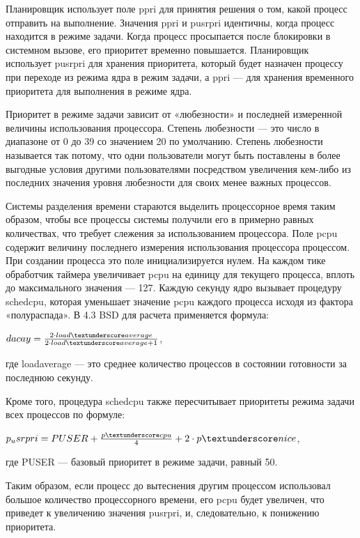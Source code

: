 \documentclass[12pt]{report}
\begin{document}
Планировщик использует поле p\textunderscore pri для принятия решения о том, какой процесс отправить на выполнение. Значения p\textunderscore pri и p\textunderscore usrpri идентичны, когда процесс находится в режиме задачи. Когда процесс просыпается после блокировки в системном вызове, его приоритет временно повышается. Планировщик использует p\textunderscore usrpri для хранения приоритета, который будет назначен процессу при переходе из режима ядра в режим задачи, а p\textunderscore pri — для хранения временного приоритета для выполнения в режиме ядра.

Приоритет в режиме задачи зависит от «любезности» и последней измеренной величины использования процессора. Степень любезности
—	это число в диапазоне от 0 до 39 со значением 20 по умолчанию. Степень любезности называется так потому, что одни пользователи могут быть поставлены в более выгодные условия другими пользователями посредством увеличения кем-либо из последних значения уровня любезности для своих менее важных процессов.

Системы разделения времени стараются выделить процессорное время таким образом, чтобы все процессы системы получили его в примерно равных количествах, что требует слежения за использованием процессора. Поле p\textunderscore cpu содержит величину последнего измерения использования процессора процессом. При создании процесса это поле инициализируется нулем. На каждом тике обработчик таймера увеличивает p\textunderscore cpu на единицу для текущего процесса, вплоть до максимального значения — 127. Каждую секунду ядро вызывает процедуру schedcpu, которая уменьшает значение p\textunderscore cpu каждого процесса исходя из фактора «полураспада». В 4.3 BSD для расчета применяется формула:

\begin{center}
	$dacay = \frac{2 \cdot load\textunderscore average}{2 \cdot load\textunderscore average +1 }$,
\end{center}
где load\textunderscore average — это среднее количество процессов в состоянии готовности за последнюю секунду.

Кроме того, процедура schedcpu также пересчитывает приоритеты режима задачи всех процессов по формуле:
\begin{center}
	$p_{u}srpri = PUSER + \frac{p \textunderscore cpu}{4} + 2
	\cdot p \textunderscore nice$,
\end{center}
где PUSER — базовый приоритет в режиме задачи, равный 50.

Таким образом, если процесс до вытеснения другим процессом использовал большое количество процессорного времени, его p\textunderscore cpu будет увеличен, что приведет к увеличению значения p\textunderscore usrpri, и, следовательно, к понижению приоритета.
\end{document}
